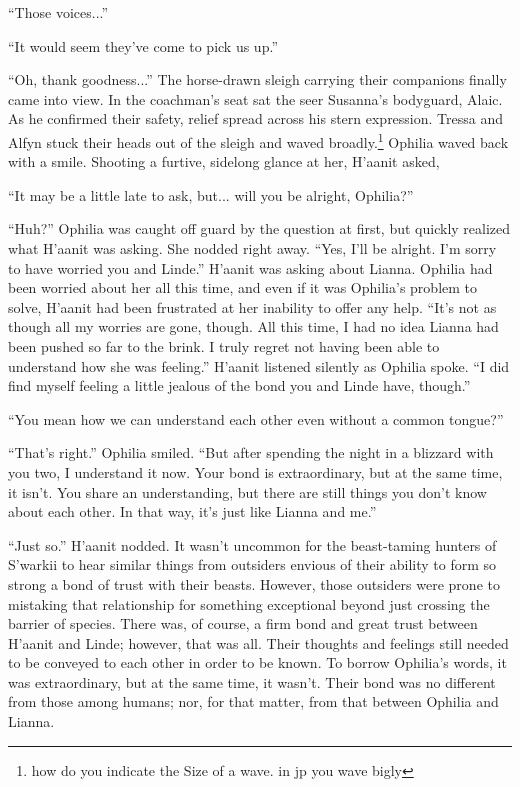 ``Those voices...''

``It would seem they've come to pick us up.''

``Oh, thank goodness...'' The horse-drawn sleigh carrying their companions finally came into view. In the coachman's seat sat the seer Susanna's bodyguard, Alaic. As he confirmed their safety, relief spread across his stern expression. Tressa and Alfyn stuck their heads out of the sleigh and waved broadly.\footnote{how do you indicate the Size of a wave. in jp you wave bigly} Ophilia waved back with a smile. Shooting a furtive, sidelong glance at her, H'aanit asked,

``It may be a little late to ask, but... will you be alright, Ophilia?''

``Huh?'' Ophilia was caught off guard by the question at first, but quickly realized what H'aanit was asking. She nodded right away. ``Yes, I'll be alright. I'm sorry to have worried you and Linde.'' H'aanit was asking about Lianna. Ophilia had been worried about her all this time, and even if it was Ophilia's problem to solve, H'aanit had been frustrated at her inability to offer any help. ``It's not as though all my worries are gone, though. All this time, I had no idea Lianna had been pushed so far to the brink. I truly regret not having been able to understand how she was feeling.'' H'aanit listened silently as Ophilia spoke. ``I did find myself feeling a little jealous of the bond you and Linde have, though.''

``You mean how we can understand each other even without a common tongue?''

``That's right.'' Ophilia smiled. ``But after spending the night in a blizzard with you two, I understand it now. Your bond is extraordinary, but at the same time, it isn't. You share an understanding, but there are still things you don't know about each other. In that way, it's just like Lianna and me.''

``Just so.'' H'aanit nodded. It wasn't uncommon for the beast-taming hunters of S'warkii to hear similar things from outsiders envious of their ability to form so strong a bond of trust with their beasts. However, those outsiders were prone to mistaking that relationship for something exceptional beyond just crossing the barrier of species. There was, of course, a firm bond and great trust between H'aanit and Linde; however, that was all. Their thoughts and feelings still needed to be conveyed to each other in order to be known. To borrow Ophilia's words, it was extraordinary, but at the same time, it wasn't. Their bond was no different from those among humans; nor, for that matter, from that between Ophilia and Lianna.


